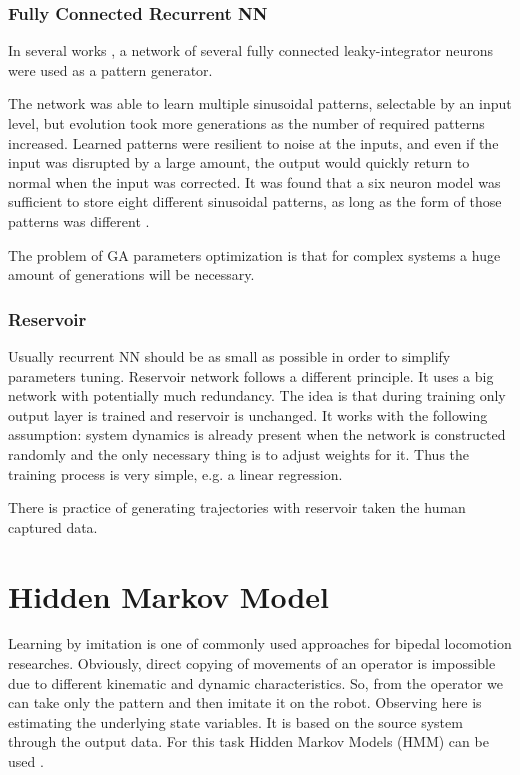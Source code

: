 \documentclass[12pt,a4paper]{report}
\begin{document}
				\subsubsection{Fully Connected Recurrent NN}
					In several works \cite{reil2002evolution}, \cite{petridis1994recurrent} a network of several fully connected leaky-integrator neurons were used as a pattern generator. 
					
					The network was able to learn multiple sinusoidal patterns, selectable by an input level, but evolution took more generations as the number of required patterns increased. Learned patterns were resilient to noise at the inputs, and even if the input was disrupted by a large amount, the output would quickly return to normal when the input was corrected. It was found that a six neuron model was sufficient to store eight different sinusoidal patterns, as long as the form of those patterns was different \cite{wright2014intelligent}.
					
					The problem of GA parameters optimization is that for complex systems a huge amount of generations will be necessary. 
				\subsubsection{Reservoir}
					Usually recurrent NN should be as small as possible in order to simplify parameters tuning. Reservoir network follows a different principle. It uses a big network with potentially much redundancy. The idea is that during training only output layer is trained and reservoir is unchanged. It works with the following assumption: system dynamics is already present when the network is constructed randomly and the only necessary thing is to adjust weights for it. Thus the training process is very simple, e.g. a linear regression.
					
					There is practice \cite{wyffels2009design} of generating trajectories with reservoir taken the human captured data.
		\section{Hidden Markov Model}
			Learning by imitation is one of commonly used approaches for bipedal locomotion researches. Obviously, direct copying of movements of an operator is impossible due to different kinematic and dynamic characteristics. So, from the operator we can take only the pattern and then imitate it on the robot. Observing here is estimating the underlying state variables. It is based on the source system through the output data. For this task Hidden Markov Models (HMM) can be used \cite{inamura2004embodied}. 
			
\end{document}
